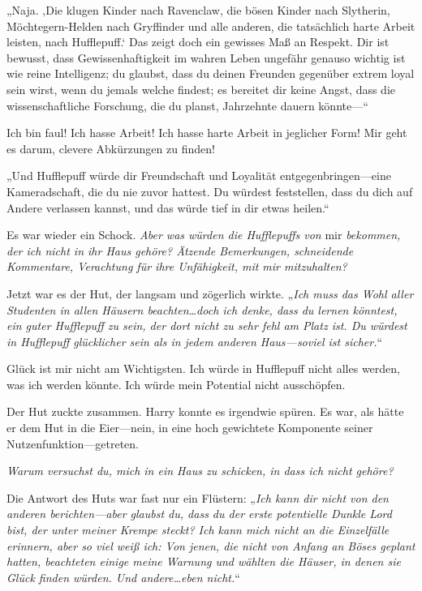 {„Naja. ‚Die klugen Kinder nach Ravenclaw, die bösen Kinder nach Slytherin, Möchtegern-Helden nach Gryffinder und alle anderen, die tatsächlich harte Arbeit leisten, nach Hufflepuff.` Das zeigt doch ein gewisses Maß an Respekt. Dir ist bewusst, dass Gewissenhaftigkeit im wahren Leben ungefähr genauso wichtig ist wie reine Intelligenz; du glaubst, dass du deinen Freunden gegenüber extrem loyal sein wirst, wenn du jemals welche findest; es bereitet dir keine Angst, dass die wissenschaftliche Forschung, die du planst, Jahrzehnte dauern könnte—“

Ich bin faul! Ich hasse Arbeit! Ich hasse harte Arbeit in jeglicher Form! Mir geht es darum, clevere Abkürzungen zu finden!

„Und Hufflepuff würde dir Freundschaft und Loyalität entgegenbringen—eine Kameradschaft, die du nie zuvor hattest. Du würdest feststellen, dass du dich auf Andere verlassen kannst, und das würde tief in dir etwas heilen.“

Es war wieder ein Schock. \emph{Aber was würden die Hufflepuffs von} mir \emph{bekommen, der ich nicht in ihr Haus gehöre? Ätzende Bemerkungen, schneidende Kommentare, Verachtung für ihre Unfähigkeit, mit mir mitzuhalten?}

Jetzt war es der Hut, der langsam und zögerlich wirkte. „\emph{Ich muss das Wohl aller Studenten in allen Häusern beachten…doch ich denke, dass du lernen könntest, ein guter Hufflepuff zu sein, der dort nicht zu sehr fehl am Platz ist. Du würdest in Hufflepuff glücklicher sein als in jedem anderen Haus—soviel ist sicher.}“

Glück ist mir nicht am Wichtigsten. Ich würde in Hufflepuff nicht alles werden, was ich werden könnte. Ich würde mein Potential nicht ausschöpfen.

Der Hut zuckte zusammen. Harry konnte es irgendwie spüren. Es war, als hätte er dem Hut in die Eier—nein, in eine hoch gewichtete Komponente seiner Nutzenfunktion—getreten.

\emph{Warum versuchst du, mich in ein Haus zu schicken, in dass ich nicht gehöre?}

Die Antwort des Huts war fast nur ein Flüstern: „\emph{Ich kann dir nicht von den anderen berichten—aber glaubst du, dass du der erste potentielle Dunkle Lord bist, der unter meiner Krempe steckt? Ich kann mich nicht an die Einzelfälle erinnern, aber so viel weiß ich: Von jenen, die nicht von Anfang an Böses geplant hatten, beachteten einige meine Warnung und wählten die Häuser, in denen sie Glück finden würden. Und andere…eben nicht.}“

}
